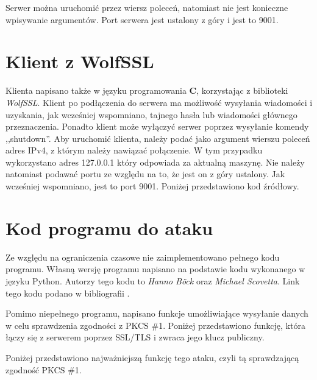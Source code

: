 \documentclass[12pt,twoside,a4]{mwbk}
\theoremstyle{definition}
\begin{document}


Serwer można uruchomić przez wiersz poleceń, natomiast nie jest konieczne wpisywanie argumentów. Port serwera jest ustalony z góry i jest to 9001.

\section{Klient z WolfSSL}
Klienta napisano także w języku programowania \textbf{C}, korzystając z biblioteki \textit{WolfSSL}. Klient po podłączenia do serwera ma możliwość wysyłania wiadomości i uzyskania, jak wcześniej wspomniano, tajnego hasła lub wiadomości głównego przeznaczenia. Ponadto klient może wyłączyć serwer poprzez wysyłanie komendy ,,shutdown''. Aby uruchomić klienta, należy podać jako argument wierszu poleceń adres IPv4, z którym należy nawiązać połączenie. W tym przypadku wykorzystano adres 127.0.0.1 który odpowiada za aktualną maszynę. Nie należy natomiast podawać portu ze względu na to, że jest on z góry ustalony. Jak wcześniej wspomniano, jest to port 9001. Poniżej przedstawiono kod źródłowy.




\section{Kod programu do ataku}
Ze względu na ograniczenia czasowe nie zaimplementowano pełnego kodu programu. Własną wersję programu napisano na podstawie kodu wykonanego w języku Python. Autorzy tego kodu to \textit{Hanno Böck} oraz \textit{Michael Scovetta}. Link tego kodu podano w bibliografii \cite{robot-attack}. \\ \par

Pomimo niepełnego programu, napisano funkcje umożliwiające wysyłanie danych w celu sprawdzenia zgodności z PKCS \#1. Poniżej przedstawiono funkcję, która łączy się z serwerem poprzez SSL/TLS i zwraca jego klucz publiczny.



Poniżej przedstawiono najważniejszą funkcję tego ataku, czyli tą sprawdzającą zgodność PKCS \#1.


\end{document}
